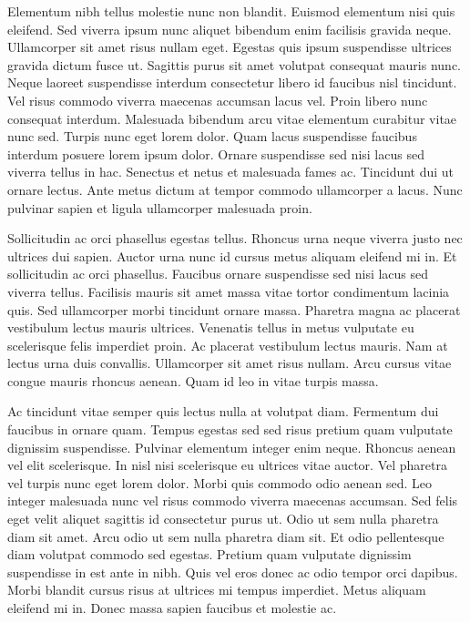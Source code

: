 Elementum nibh tellus molestie nunc non blandit. Euismod elementum nisi quis eleifend. Sed viverra ipsum nunc aliquet bibendum enim facilisis gravida neque. Ullamcorper sit amet risus nullam eget. Egestas quis ipsum suspendisse ultrices gravida dictum fusce ut. Sagittis purus sit amet volutpat consequat mauris nunc. Neque laoreet suspendisse interdum consectetur libero id faucibus nisl tincidunt. Vel risus commodo viverra maecenas accumsan lacus vel. Proin libero nunc consequat interdum. Malesuada bibendum arcu vitae elementum curabitur vitae nunc sed. Turpis nunc eget lorem dolor. Quam lacus suspendisse faucibus interdum posuere lorem ipsum dolor. Ornare suspendisse sed nisi lacus sed viverra tellus in hac. Senectus et netus et malesuada fames ac. Tincidunt dui ut ornare lectus. Ante metus dictum at tempor commodo ullamcorper a lacus. Nunc pulvinar sapien et ligula ullamcorper malesuada proin.

Sollicitudin ac orci phasellus egestas tellus. Rhoncus urna neque viverra justo nec ultrices dui sapien. Auctor urna nunc id cursus metus aliquam eleifend mi in. Et sollicitudin ac orci phasellus. Faucibus ornare suspendisse sed nisi lacus sed viverra tellus. Facilisis mauris sit amet massa vitae tortor condimentum lacinia quis. Sed ullamcorper morbi tincidunt ornare massa. Pharetra magna ac placerat vestibulum lectus mauris ultrices. Venenatis tellus in metus vulputate eu scelerisque felis imperdiet proin. Ac placerat vestibulum lectus mauris. Nam at lectus urna duis convallis. Ullamcorper sit amet risus nullam. Arcu cursus vitae congue mauris rhoncus aenean. Quam id leo in vitae turpis massa.

Ac tincidunt vitae semper quis lectus nulla at volutpat diam. Fermentum dui faucibus in ornare quam. Tempus egestas sed sed risus pretium quam vulputate dignissim suspendisse. Pulvinar elementum integer enim neque. Rhoncus aenean vel elit scelerisque. In nisl nisi scelerisque eu ultrices vitae auctor. Vel pharetra vel turpis nunc eget lorem dolor. Morbi quis commodo odio aenean sed. Leo integer malesuada nunc vel risus commodo viverra maecenas accumsan. Sed felis eget velit aliquet sagittis id consectetur purus ut. Odio ut sem nulla pharetra diam sit amet. Arcu odio ut sem nulla pharetra diam sit. Et odio pellentesque diam volutpat commodo sed egestas. Pretium quam vulputate dignissim suspendisse in est ante in nibh. Quis vel eros donec ac odio tempor orci dapibus. Morbi blandit cursus risus at ultrices mi tempus imperdiet. Metus aliquam eleifend mi in. Donec massa sapien faucibus et molestie ac.

